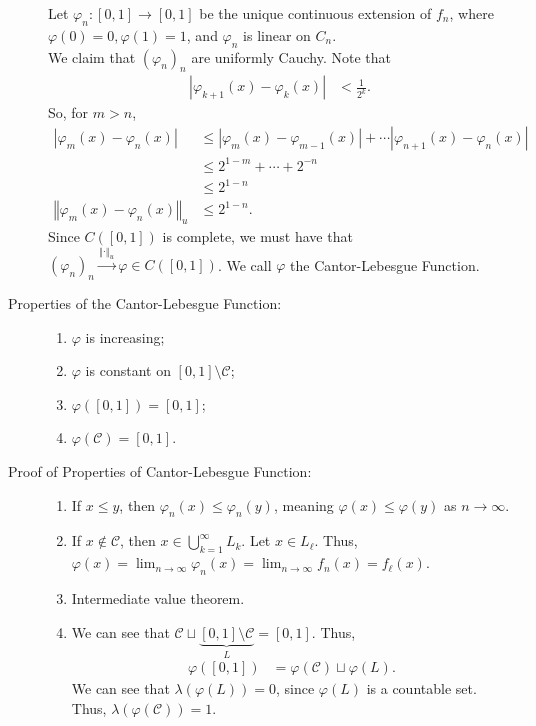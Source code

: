 \documentclass[10pt]{extarticle}
\newcommand{\norm}[1]{\left\Vert #1 \right\Vert}
\begin{document}
\begin{description}
      Let $\varphi_n: [0,1]\rightarrow [0,1]$ be the unique continuous extension of $f_n$, where $\varphi(0) = 0, \varphi(1) = 1$, and $\varphi_n$ is linear on $C_n$.\\

      We claim that $(\varphi_n)_n$ are uniformly Cauchy. Note that
      \begin{align*}
        |\varphi_{k+1}(x) -\varphi_k(x)| &< \frac{1}{2^k}.
      \end{align*}
      So, for $m > n$,
      \begin{align*}
        |\varphi_m(x) - \varphi_n(x)| &\leq |\varphi_{m}(x) - \varphi_{m-1}(x)| + \cdots | \varphi_{n+1}(x) - \varphi_n(x)|\\
                                      &\leq 2^{1-m} + \cdots + 2^{-n}\\
                                      &\leq 2^{1-n}\\
        \norm{\varphi_m(x) - \varphi_n(x)}_{u} &\leq 2^{1-n}.
      \end{align*}
      Since $C([0,1])$ is complete, we must have that $(\varphi_n)_n\xrightarrow{\norm{\cdot}_u}\varphi\in C([0,1])$. We call $\varphi$ the Cantor-Lebesgue Function.
    \item[Properties of the Cantor-Lebesgue Function:]\hfill
      \begin{enumerate}[(1)]
        \item $\varphi$ is increasing;
        \item $\varphi$ is constant on $[0,1]\setminus \mathcal{C}$;
        \item $\varphi([0,1]) = [0,1]$;
        \item $\varphi(\mathcal{C}) = [0,1]$.
      \end{enumerate}
    \item[Proof of Properties of Cantor-Lebesgue Function:]\hfill
      \begin{enumerate}[(1)]
        \item If $x\leq y$, then $\varphi_n(x) \leq \varphi_n(y)$, meaning $\varphi(x) \leq \varphi(y)$ as $n\rightarrow\infty$.
        \item If $x\notin \mathcal{C}$, then $x\in \bigcup_{k=1}^{\infty} L_k$. Let $x\in L_{\ell}$. Thus, $\varphi(x) = \lim_{n\rightarrow\infty}\varphi_n(x)=\lim_{n\rightarrow\infty}f_{n}(x) = f_{\ell}(x)$.
        \item Intermediate value theorem.
        \item We can see that $\mathcal{C}\sqcup \underbrace{[0,1]\setminus \mathcal{C}}_{L} = [0,1]$. Thus, 
          \begin{align*}
            \varphi([0,1]) &= \varphi(\mathcal{C}) \sqcup \varphi(L).
          \end{align*}
          We can see that $\lambda(\varphi(L)) = 0$, since $\varphi(L)$ is a countable set. Thus, $\lambda(\varphi(\mathcal{C})) = 1$.\\


\end{enumerate}
\end{description}
\end{document}

